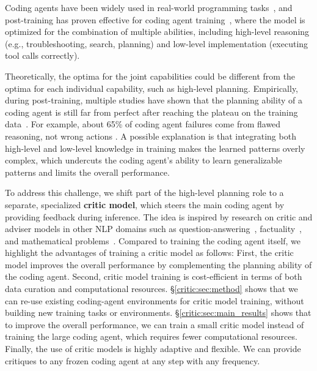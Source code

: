 Coding agents have been widely used in real-world programming tasks~\citep{ICLR2024_edac78c3,swe-agent}, and post-training has proven effective for coding agent training~\cite{pmlr-v267-pan25g,yang2025swesmith,xie2026hybridgymtrainingcodingagents}, where the model is optimized for the combination of multiple abilities, including high-level reasoning (e.g., troubleshooting, search, planning) and low-level implementation (executing tool calls correctly).

Theoretically, the optima for the joint capabilities could be different from the optima for each individual capability, such as high-level planning.
Empirically, during post-training, multiple studies have shown that the planning ability of a coding agent is still far from perfect after reaching the plateau on the training data~\cite{xie2026hybridgymtrainingcodingagents,wang2026rubric}.
For example, about 65\% of coding agent failures come from flawed reasoning, not wrong actions \citep{liu2025empiricalfailures}.
A possible explanation is that integrating both high-level and low-level knowledge in training makes the learned patterns overly complex, which undercuts the coding agent's ability to learn generalizable patterns and limits the overall performance. 

To address this challenge, we shift part of the high-level planning role to a separate, specialized \textbf{critic model}, which steers the main coding agent by providing feedback during inference.
The idea is inspired by research on critic and adviser models in other NLP domains such as question-answering~\cite{gou2023critic}, factuality~\cite{xie-etal-2025-factuality}, and mathematical problems~\cite{ICLR2024_aca97732}.
Compared to training the coding agent itself, we highlight the advantages of training a critic model as follows:
First, the critic model improves the overall performance by complementing the planning ability of the coding agent.
Second, critic model training is cost-efficient in terms of both data curation and computational resources.
\S\ref{critic:sec:method} shows that we can re-use existing coding-agent environments for critic model training, without building new training tasks or environments.
\S\ref{critic:sec:main_results} shows that to improve the overall performance, we can train a small critic model instead of training the large coding agent, which requires fewer computational resources.
Finally, the use of critic models is highly adaptive and flexible.
We can provide critiques to any frozen coding agent at any step with any frequency.


